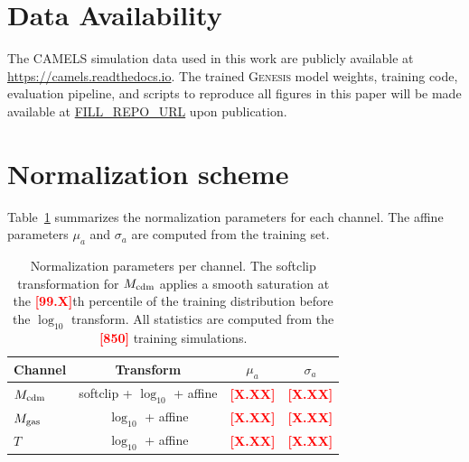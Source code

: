 \documentclass[usenatbib]{mnras}
\newcommand{\FILL}[1]{\textcolor{red}{\textbf{[#1]}}}
\newcommand{\Mcdm}{M_{\rm cdm}}
\newcommand{\Mgas}{M_{\rm gas}}
\newcommand{\Tgas}{T}
\begin{document}
\section*{Data Availability}

The CAMELS simulation data used in this work are publicly available at
\url{https://camels.readthedocs.io}.
The trained \textsc{Genesis} model weights, training code, evaluation
pipeline, and scripts to reproduce all figures in this paper will be
made available at \url{FILL_REPO_URL} upon publication.




\appendix

\section{Normalization scheme}
\label{app:norm}

Table~\ref{tab:norm} summarizes the normalization parameters for each
channel.
The affine parameters $\mu_a$ and $\sigma_a$ are computed from the
training set.

\begin{table}
  \centering
  \begin{tabular}{lccc}
    \hline
    Channel & Transform & $\mu_a$ & $\sigma_a$ \\
    \hline
    $\Mcdm$ & softclip + $\log_{10}$ + affine
      & \FILL{X.XX} & \FILL{X.XX} \\
    $\Mgas$ & $\log_{10}$ + affine
      & \FILL{X.XX} & \FILL{X.XX} \\
    $\Tgas$ & $\log_{10}$ + affine
      & \FILL{X.XX} & \FILL{X.XX} \\
    \hline
  \end{tabular}
  \caption{Normalization parameters per channel.
    The softclip transformation for $\Mcdm$ applies a smooth saturation
    at the \FILL{99.X}th percentile of the training distribution before
    the $\log_{10}$ transform.
    All statistics are computed from the \FILL{850} training
    simulations.}
  \label{tab:norm}
\end{table}
\end{document}
